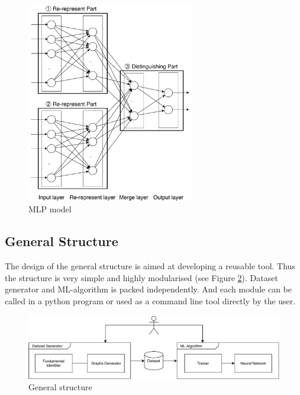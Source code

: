 \begin{figure}[h]
    \centering
    \includegraphics[width=0.65\textwidth]{img/mlp.pdf}
    \caption{MLP model}
    \label{fig:mlp_model}
\end{figure}

\subsection{General Structure}
The design of the general structure is aimed at developing a reusable tool.
Thus the structure is very simple and highly modularised (see Figure \ref{fig:general_str}).
Dataset generator and ML-algorithm is packed independently.
And each module can be called in a python program or used as a command line tool directly by the user.
\begin{figure}[h]
    \centering
    \includegraphics[width=\textwidth]{img/architecture.pdf}
    \caption{General structure}
    \label{fig:general_str}
\end{figure}

